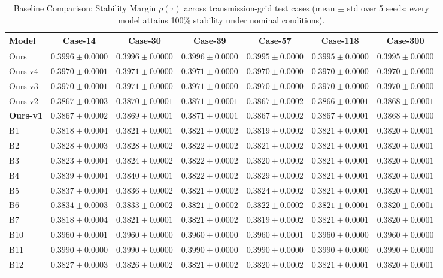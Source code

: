 \begin{table}[t]
\centering
\caption{Baseline Comparison: Stability Margin $\rho(\tau)$ across transmission-grid test cases (mean $\pm$ std over 5 seeds; every model attains 100\% stability under nominal conditions).}
\label{tab:main_comparison}
\begin{tabular}{lcccccc}
\toprule
Model & Case-14 & Case-30 & Case-39 & Case-57 & Case-118 & Case-300 \\
\midrule
Ours & $0.3996 \pm 0.0000$ & $0.3996 \pm 0.0000$ & $0.3996 \pm 0.0000$ & $0.3995 \pm 0.0000$ & $0.3995 \pm 0.0000$ & $0.3995 \pm 0.0000$ \\
Ours-v4 & $0.3970 \pm 0.0001$ & $0.3971 \pm 0.0000$ & $0.3971 \pm 0.0000$ & $0.3970 \pm 0.0000$ & $0.3970 \pm 0.0000$ & $0.3970 \pm 0.0000$ \\
Ours-v3 & $0.3970 \pm 0.0001$ & $0.3971 \pm 0.0000$ & $0.3971 \pm 0.0000$ & $0.3970 \pm 0.0000$ & $0.3970 \pm 0.0000$ & $0.3970 \pm 0.0000$ \\
Ours-v2 & $0.3867 \pm 0.0003$ & $0.3870 \pm 0.0001$ & $0.3871 \pm 0.0001$ & $0.3867 \pm 0.0002$ & $0.3866 \pm 0.0001$ & $0.3868 \pm 0.0001$ \\
\textbf{Ours-v1} & $0.3867 \pm 0.0002$ & $0.3869 \pm 0.0001$ & $0.3871 \pm 0.0001$ & $0.3867 \pm 0.0002$ & $0.3867 \pm 0.0001$ & $0.3868 \pm 0.0000$ \\
B1 & $0.3818 \pm 0.0004$ & $0.3821 \pm 0.0001$ & $0.3821 \pm 0.0002$ & $0.3819 \pm 0.0002$ & $0.3821 \pm 0.0001$ & $0.3820 \pm 0.0001$ \\
B2 & $0.3828 \pm 0.0003$ & $0.3828 \pm 0.0002$ & $0.3822 \pm 0.0002$ & $0.3821 \pm 0.0002$ & $0.3821 \pm 0.0001$ & $0.3820 \pm 0.0001$ \\
B3 & $0.3823 \pm 0.0004$ & $0.3824 \pm 0.0002$ & $0.3822 \pm 0.0002$ & $0.3820 \pm 0.0002$ & $0.3821 \pm 0.0001$ & $0.3820 \pm 0.0001$ \\
B4 & $0.3839 \pm 0.0004$ & $0.3840 \pm 0.0001$ & $0.3822 \pm 0.0002$ & $0.3829 \pm 0.0002$ & $0.3821 \pm 0.0001$ & $0.3820 \pm 0.0001$ \\
B5 & $0.3837 \pm 0.0004$ & $0.3836 \pm 0.0002$ & $0.3821 \pm 0.0002$ & $0.3824 \pm 0.0002$ & $0.3821 \pm 0.0001$ & $0.3820 \pm 0.0001$ \\
B6 & $0.3834 \pm 0.0003$ & $0.3833 \pm 0.0002$ & $0.3821 \pm 0.0002$ & $0.3822 \pm 0.0002$ & $0.3821 \pm 0.0001$ & $0.3820 \pm 0.0001$ \\
B7 & $0.3818 \pm 0.0004$ & $0.3821 \pm 0.0001$ & $0.3821 \pm 0.0002$ & $0.3819 \pm 0.0002$ & $0.3821 \pm 0.0001$ & $0.3820 \pm 0.0001$ \\
B10 & $0.3960 \pm 0.0001$ & $0.3960 \pm 0.0000$ & $0.3960 \pm 0.0000$ & $0.3960 \pm 0.0001$ & $0.3960 \pm 0.0000$ & $0.3960 \pm 0.0000$ \\
B11 & $0.3990 \pm 0.0000$ & $0.3990 \pm 0.0000$ & $0.3990 \pm 0.0000$ & $0.3990 \pm 0.0000$ & $0.3990 \pm 0.0000$ & $0.3990 \pm 0.0000$ \\
B12 & $0.3827 \pm 0.0003$ & $0.3826 \pm 0.0002$ & $0.3821 \pm 0.0002$ & $0.3820 \pm 0.0002$ & $0.3821 \pm 0.0001$ & $0.3820 \pm 0.0001$ \\
\bottomrule
\end{tabular}
\end{table}
